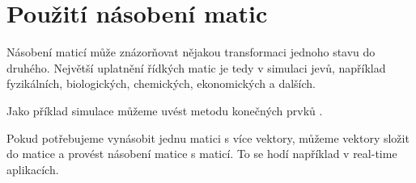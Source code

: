 
\section{Použití násobení matic}

Násobení maticí může znázorňovat nějakou transformaci jednoho stavu do druhého. Největší uplatnění řídkých matic je tedy v simulaci jevů, například fyzikálních, biologických, chemických, ekonomických a dalších. 

Jako příklad simulace můžeme uvést metodu konečných prvků \cite{4020926}\cite{0967-3334-30-6-S01}.


Pokud potřebujeme vynásobit jednu matici s více vektory, můžeme vektory složit do matice a provést násobení matice s maticí. To se hodí například v real-time aplikacích.




